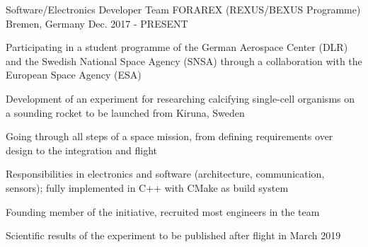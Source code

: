 

\begin{cventries}

  \cventry
    {Software/Electronics Developer} %
    {Team FORAREX (REXUS/BEXUS Programme)} %
    {Bremen, Germany} %
    {Dec. 2017 - PRESENT} %
    {
      \begin{cvitems} %
        \item {Participating in a student programme of the German Aerospace Center (DLR) and the Swedish National Space Agency (SNSA) through a collaboration with the European Space Agency (ESA)}
        \item {Development of an experiment for researching calcifying single-cell organisms on a sounding rocket to be launched from Kiruna, Sweden}
        \item {Going through all steps of a space mission, from defining requirements over design to the integration and flight}
        \item {Responsibilities in electronics and software (architecture, communication, sensors); fully implemented in C++ with CMake as build system}
        \item {Founding member of the initiative, recruited most engineers in the team}
        \item {Scientific results of the experiment to be published after flight in March 2019}
      \end{cvitems}
    }
\begin{comment}
  \cventry
    {Independently traveled through Southeast Asia} %
    {Backpacking} %
    {Southeast Asia} %
    {Jan. 2016 - Jun 2016} %
    {
      \begin{cvitems} %
        \item {Visited Thailand, Malaysia, Singapore, Indonesia, The Philippines, Vietnam, Laos, Cambodia and Japan}
      \end{cvitems}
    }
\end{comment}
\end{cventries}
